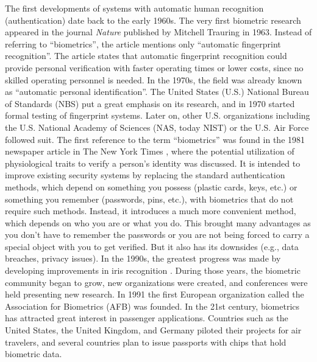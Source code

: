 The first developments of systems with automatic human recognition (authentication) date back to the early 1960s. The very first biometric research appeared in the journal \emph{Nature} published by Mitchell Trauring in 1963. Instead of referring to ``biometrics'', the article mentions only ``automatic fingerprint recognition''. The article states that automatic fingerprint recognition could provide personal verification with faster operating times or lower costs, since no skilled operating personnel is needed.
In the 1970s, the field was already known as ``automatic personal identification''. The United States (U.S.) National Bureau of Standards (NBS) put a great emphasis on its research, and in 1970 started formal testing of fingerprint systems. Later on, other U.S. organizations including the U.S. National Academy of Sciences (NAS, today NIST) or the U.S. Air Force followed suit.
The first reference to the term ``biometrics'' was found in the 1981 newspaper article in The New York Times \cite{RecognizingTheRealYouTNYT1981}, where the potential utilization of physiological traits to verify a person's identity was discussed. It is intended to improve existing security systems by replacing the standard authentication methods, which depend on something you possess (plastic cards, keys, etc.) or something you remember (passwords, pins, etc.), with biometrics that do not require such methods. Instead, it introduces a much more convenient method, which depends on who you are or what you do. This brought many advantages as you don't have to remember the passwords or you are not being forced to carry a special object with you to get verified. But it also has its downsides (e.g., data breaches, privacy issues).
In the 1990s, the greatest progress was made by developing improvements in iris recognition \cite{biometricsHistory}. During those years, the biometric community began to grow, new organizations were created, and conferences were held presenting new research. In 1991 the first European organization called the Association for Biometrics (AFB) was founded.
In the 21st century, biometrics has attracted great interest in passenger applications. Countries such as the United States, the United Kingdom, and Germany piloted their projects for air travelers, and several countries plan to issue passports with chips that hold biometric data.

